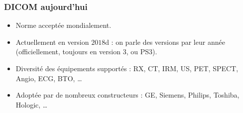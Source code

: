 	\frame
	{
		\frametitle{DICOM aujourd'hui}
		\begin{itemize}
			\item Norme accept\'ee mondialement.
			\item Actuellement en version $2018$d : on parle des versions par leur ann\'ee (officiellement, toujours en version 3, ou PS3).
			\item Diversit\'e des \'equipements support\'es : RX, CT, IRM, US, PET, SPECT, Angio, ECG, BTO, \ldots
			\item Adopt\'ee par de nombreux constructeurs : GE, Siemens, Philips, Toshiba, Hologic, \ldots
		\end{itemize}
	}
